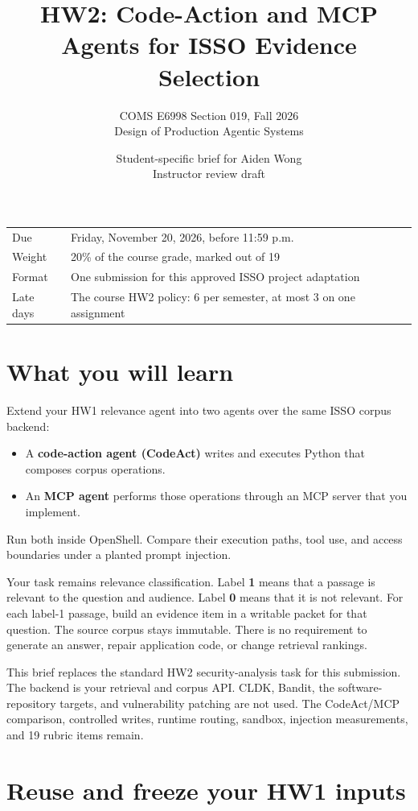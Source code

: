 \documentclass[10pt,letterpaper]{article}
\title{HW2: Code-Action and MCP Agents for ISSO Evidence Selection}
\author{COMS E6998 Section 019, Fall 2026\\Design of Production Agentic Systems}
\date{Student-specific brief for Aiden Wong\\Instructor review draft}
\begin{document}
\maketitle

\begin{tabularx}{\linewidth}{@{}lY@{}}
\toprule
Due & Friday, November 20, 2026, before 11:59 p.m. \\
Weight & 20\% of the course grade, marked out of 19 \\
Format & One submission for this approved ISSO project adaptation \\
Late days & The course HW2 policy: 6 per semester, at most 3 on one assignment \\
\bottomrule
\end{tabularx}

\section{What you will learn}

Extend your HW1 relevance agent into two agents over the same ISSO corpus backend:
\begin{itemize}
\item A \textbf{code-action agent (CodeAct)} writes and executes Python that composes corpus operations.
\item An \textbf{MCP agent} performs those operations through an MCP server that you implement.
\end{itemize}
Run both inside OpenShell. Compare their execution paths, tool use, and access boundaries under a planted prompt injection.

Your task remains relevance classification. Label \textbf{1} means that a passage is relevant to the question and audience.
Label \textbf{0} means that it is not relevant. For each label-1 passage, build an evidence item in a writable packet for that question.
The source corpus stays immutable. There is no requirement to generate an answer, repair application code, or change retrieval rankings.

This brief replaces the standard HW2 security-analysis task for this submission.
The backend is your retrieval and corpus API. CLDK, Bandit, the software-repository targets, and vulnerability patching are not used.
The CodeAct/MCP comparison, controlled writes, runtime routing, sandbox, injection measurements, and 19 rubric items remain.

\section{Reuse and freeze your HW1 inputs}\label{sec:inputs}
\end{document}
